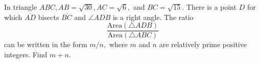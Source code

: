 In triangle $ABC, AB=\sqrt{30}, AC=\sqrt{6},$ and $BC=\sqrt{15}.$  There is a point $D$ for which $\overline{AD}$ bisects $\overline{BC}$ and $\angle ADB$ is a right angle.  The ratio \[ \frac{\text{Area}(\triangle ADB)}{\text{Area}(\triangle ABC)} \] can be written in the form $m/n,$ where $m$ and $n$ are relatively prime positive integers.  Find $m+n.$
